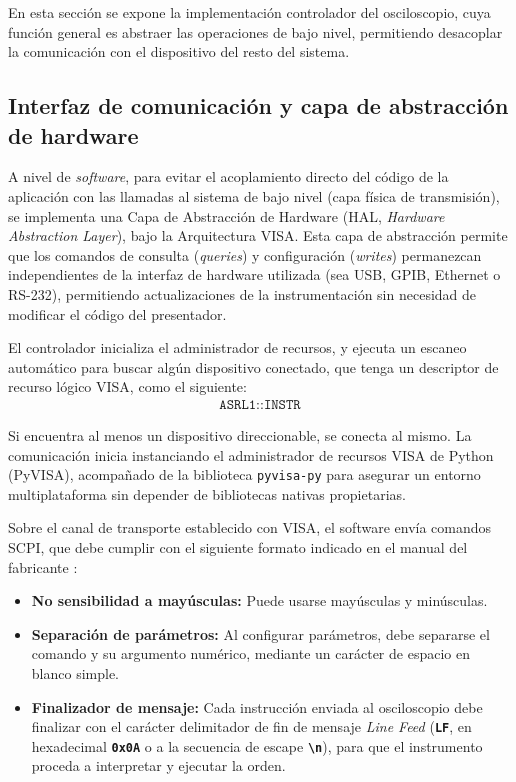 En esta sección se expone la implementación controlador del osciloscopio, cuya función general es abstraer las operaciones de bajo nivel, permitiendo desacoplar la comunicación con el dispositivo del resto del sistema.

\subsection{Interfaz de comunicación y capa de abstracción de hardware}
\label{subsec:interfaz_fisica_hal}

A nivel de \emph{software}, para evitar el acoplamiento directo del código de la aplicación con las llamadas al sistema de bajo nivel (capa física de transmisión), se implementa una Capa de Abstracción de Hardware (HAL, \emph{Hardware Abstraction Layer}), bajo la Arquitectura VISA. Esta capa de abstracción permite que los comandos de consulta (\textit{queries}) y configuración (\textit{writes}) permanezcan independientes de la interfaz de hardware utilizada (sea USB, GPIB, Ethernet o RS-232), permitiendo actualizaciones de la instrumentación sin necesidad de modificar el código del presentador.

El controlador inicializa el administrador de recursos, y ejecuta un escaneo automático para buscar algún dispositivo conectado, que tenga un descriptor de recurso lógico VISA, como el siguiente:
\begin{align*}
    \texttt{ASRL1::INSTR}
\end{align*}

Si encuentra al menos un dispositivo direccionable, se conecta al mismo. La comunicación inicia instanciando el administrador de recursos VISA de Python (PyVISA), acompañado de la biblioteca \texttt{pyvisa-py} para asegurar un entorno multiplataforma sin depender de bibliotecas nativas propietarias.

Sobre el canal de transporte establecido con VISA, el software envía comandos SCPI, que debe cumplir con el siguiente formato indicado en el manual del fabricante \cite{gds1000au_ProgrammingManual}:
\begin{itemize}
    \item \textbf{No sensibilidad a mayúsculas:} Puede usarse mayúsculas y minúsculas.
    \item \textbf{Separación de parámetros:} Al configurar parámetros, debe separarse el comando y su argumento numérico, mediante un carácter de espacio en blanco simple.
    \item \textbf{Finalizador de mensaje:} Cada instrucción enviada al osciloscopio debe finalizar con el carácter delimitador de fin de mensaje \emph{Line Feed} (\textbf{\texttt{LF}}, en hexadecimal \textbf{\texttt{0x0A}} o a la secuencia de escape \textbf{\texttt{\textbackslash n}}), para que el instrumento proceda a interpretar y ejecutar la orden.
\end{itemize}

